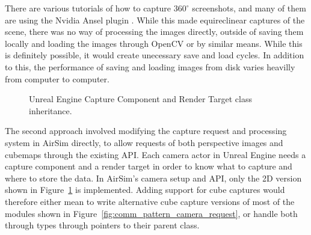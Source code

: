 There are various tutorials of how to capture $360^\circ$ screenshots, and many of them are using the Nvidia Ansel plugin \cite{SceenshotsAnsel}. While this made equireclinear captures of the scene, there was no way of processing the images directly, outside of saving them locally and loading the images through OpenCV or by similar means. While this is definitely possible, it would create unecessary save and load cycles. In addition to this, the performance of saving and loading images from disk varies heavilly from computer to computer.

\begin{figure}[!htb]
    \centering
    \caption{Unreal Engine Capture Component and Render Target class inheritance.}
    \label{fig:capture_render_inherit}
\end{figure}

The second approach involved modifying the capture request and processing system in AirSim directly, to allow requests of both perspective images and cubemaps through the existing API. Each camera actor in Unreal Engine needs a capture component and a render target in order to know what to capture and where to store the data. In AirSim's camera setup and API, only the 2D version shown in Figure~\ref{fig:capture_render_inherit} is implemented. Adding support for cube captures would therefore either mean to write alternative cube capture versions of most of the modules shown in Figure~\ref{fig:comm_pattern_camera_request}, or handle both through types through pointers to their parent class.
 
